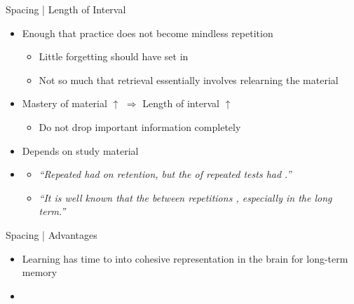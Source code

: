\documentclass{ercisbeamer}
\begin{document}
\begin{frame}{Spacing | Length of Interval}
    \begin{tbox}
        \begin{itemize}
            \item Enough that practice does not become mindless repetition
            \begin{itemize}
                \item Little forgetting should have set in
                \item Not so much that retrieval essentially involves relearning the material
            \end{itemize}
            \item Mastery of material $\uparrow$ $\Rightarrow$ Length of interval $\uparrow$
            \begin{itemize}
                \item Do not drop important information completely
            \end{itemize}
            \item Depends on study material
        \end{itemize}
    \end{tbox}
    
    \hspace{2em}
    
    \begin{tbox}
        \begin{itemize}
            \item \citet{karpicke11}
            \begin{itemize}
                \item \emph{``Repeated  had  on retention, but the  of repeated tests had .''}
                \item \emph{``It is well known that  the  between repetitions , especially in the long term.''}
            \end{itemize}
        \end{itemize}
    \end{tbox}
\end{frame}
\setbgimage{}

\begin{frame}{Spacing | Advantages}
    \begin{itemize}
        \item Learning has time to  into cohesive representation in the brain for long-term memory
        \item {}
    \end{itemize}
\end{frame}
\end{document}
